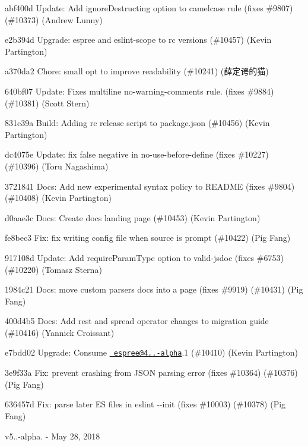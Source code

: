 \begin{DoxyItemize}
\item abf400d Update\+: Add ignore\+Destructing option to camelcase rule (fixes \#9807) (\#10373) (Andrew Lunny)
\item e2b394d Upgrade\+: espree and eslint-\/scope to rc versions (\#10457) (Kevin Partington)
\item a370da2 Chore\+: small opt to improve readability (\#10241) (薛定谔的猫)
\item 640bf07 Update\+: Fixes multiline no-\/warning-\/comments rule. (fixes \#9884) (\#10381) (Scott Stern)
\item 831c39a Build\+: Adding rc release script to package.\+json (\#10456) (Kevin Partington)
\item dc4075e Update\+: fix false negative in no-\/use-\/before-\/define (fixes \#10227) (\#10396) (Toru Nagashima)
\item 3721841 Docs\+: Add new experimental syntax policy to R\+E\+A\+D\+ME (fixes \#9804) (\#10408) (Kevin Partington)
\item d0aae3c Docs\+: Create docs landing page (\#10453) (Kevin Partington)
\item fe8bec3 Fix\+: fix writing config file when {\ttfamily source} is {\ttfamily prompt} (\#10422) (Pig Fang)
\item 917108d Update\+: Add require\+Param\+Type option to valid-\/jsdoc (fixes \#6753) (\#10220) (Tomasz Sterna)
\item 1984c21 Docs\+: move custom parsers docs into a page (fixes \#9919) (\#10431) (Pig Fang)
\item 400d4b5 Docs\+: Add rest and spread operator changes to migration guide (\#10416) (Yannick Croissant)
\item e7bdd02 Upgrade\+: Consume \href{mailto:espree@4.0.0-alpha}{\texttt{ espree@4..-\/alpha}}.1 (\#10410) (Kevin Partington)
\item 3e9f33a Fix\+: prevent crashing from J\+S\+ON parsing error (fixes \#10364) (\#10376) (Pig Fang)
\item 636457d Fix\+: parse later ES files in {\ttfamily eslint -\/-\/init} (fixes \#10003) (\#10378) (Pig Fang)
\end{DoxyItemize}

v5..-\/alpha. -\/ May 28, 2018


